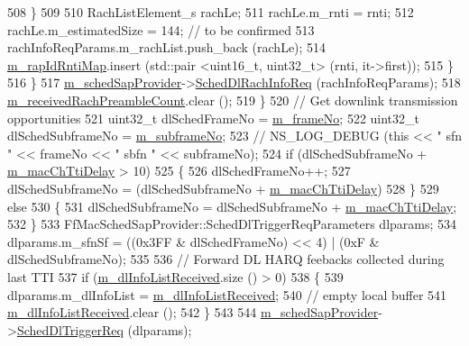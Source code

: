 \begin{DoxyCode}
508                 \}
509 
510               RachListElement\_s rachLe;
511               rachLe.m\_rnti = rnti;
512               rachLe.m\_estimatedSize = 144; \textcolor{comment}{// to be confirmed}
513               rachInfoReqParams.m\_rachList.push\_back (rachLe);
514               \hyperlink{classns3_1_1LteEnbMac_a8a3ccaeb5f77943019ed39250c3ea63e}{m\_rapIdRntiMap}.insert (std::pair <uint16\_t, uint32\_t> (rnti, it->first));
515             \}
516         \}
517       \hyperlink{classns3_1_1LteEnbMac_a48a4fe366fd18025fb8ebe4a3de2a143}{m\_schedSapProvider}->\hyperlink{classns3_1_1FfMacSchedSapProvider_af3f033e0a6d29036006e93cf302ea48a}{SchedDlRachInfoReq} (rachInfoReqParams);
518       \hyperlink{classns3_1_1LteEnbMac_a3f2ae0439200f19f8e046510579494a0}{m\_receivedRachPreambleCount}.clear ();
519     \}
520   \textcolor{comment}{// Get downlink transmission opportunities}
521   uint32\_t dlSchedFrameNo = \hyperlink{classns3_1_1LteEnbMac_a1ca20e5d0d321f28dc931bdcccadfada}{m\_frameNo};
522   uint32\_t dlSchedSubframeNo = \hyperlink{classns3_1_1LteEnbMac_adccfd57ac8aedd1182963517546fde38}{m\_subframeNo};
523   \textcolor{comment}{//   NS\_LOG\_DEBUG (this << " sfn " << frameNo << " sbfn " << subframeNo);}
524   \textcolor{keywordflow}{if} (dlSchedSubframeNo + \hyperlink{classns3_1_1LteEnbMac_a931e5e94323309225b902f9ce78bf1af}{m\_macChTtiDelay} > 10)
525     \{
526       dlSchedFrameNo++;
527       dlSchedSubframeNo = (dlSchedSubframeNo + \hyperlink{classns3_1_1LteEnbMac_a931e5e94323309225b902f9ce78bf1af}{m\_macChTtiDelay}) %
528     \}
529   \textcolor{keywordflow}{else}
530     \{
531       dlSchedSubframeNo = dlSchedSubframeNo + \hyperlink{classns3_1_1LteEnbMac_a931e5e94323309225b902f9ce78bf1af}{m\_macChTtiDelay};
532     \}
533   FfMacSchedSapProvider::SchedDlTriggerReqParameters dlparams;
534   dlparams.m\_sfnSf = ((0x3FF & dlSchedFrameNo) << 4) | (0xF & dlSchedSubframeNo);
535 
536   \textcolor{comment}{// Forward DL HARQ feebacks collected during last TTI}
537   \textcolor{keywordflow}{if} (\hyperlink{classns3_1_1LteEnbMac_ad54d6efd653cfbfa7bd4dc6bec3b6d97}{m\_dlInfoListReceived}.size () > 0)
538     \{
539       dlparams.m\_dlInfoList = \hyperlink{classns3_1_1LteEnbMac_ad54d6efd653cfbfa7bd4dc6bec3b6d97}{m\_dlInfoListReceived};
540       \textcolor{comment}{// empty local buffer}
541       \hyperlink{classns3_1_1LteEnbMac_ad54d6efd653cfbfa7bd4dc6bec3b6d97}{m\_dlInfoListReceived}.clear ();
542     \}
543 
544   \hyperlink{classns3_1_1LteEnbMac_a48a4fe366fd18025fb8ebe4a3de2a143}{m\_schedSapProvider}->\hyperlink{classns3_1_1FfMacSchedSapProvider_ae19ae1b9332c0f9b78f616a340b93955}{SchedDlTriggerReq} (dlparams);

\end{DoxyCode}
